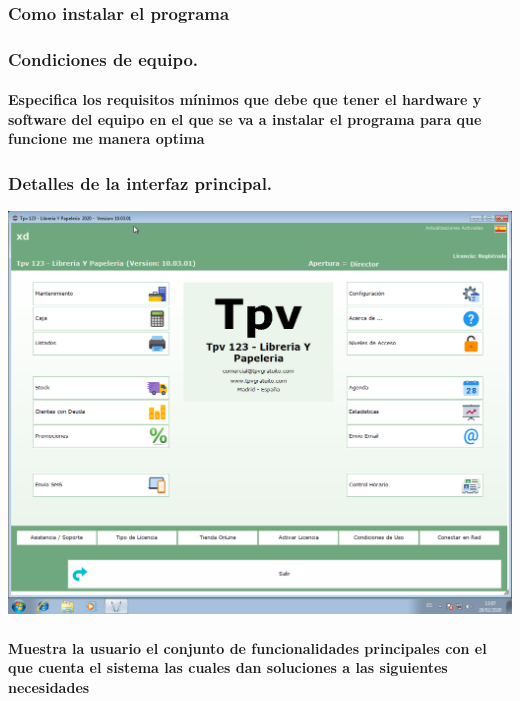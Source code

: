 \documentclass[12pt,a4paper]{ articule }
\begin{document}
\subsubsection*{Como instalar el programa}
\subsubsection*{Condiciones de equipo.}
\paragraph{Especifica los requisitos mínimos que debe que tener el hardware y software del equipo en el que se va a instalar el programa para que funcione me manera optima}
\subsubsection*{Detalles de la interfaz principal.}
\includegraphics[scale=0.35]{tpv.png} 
\paragraph{Muestra la usuario el conjunto de funcionalidades principales con el que cuenta el sistema las cuales dan soluciones a las siguientes necesidades}
\end{document}
